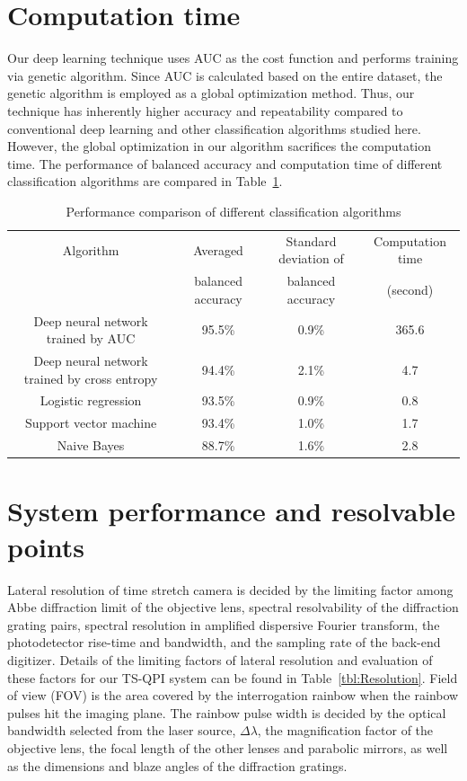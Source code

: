\documentclass[aps,pra,reprint,longbibliography,groupedaddress]{revtex4-1}
\begin{document}
\section*{Computation time}

Our deep learning technique uses AUC as the cost function and performs training via genetic algorithm. Since AUC is calculated based on the entire dataset, the genetic algorithm is employed as a global optimization method. Thus, our technique has inherently higher accuracy and repeatability compared to conventional deep learning and other classification algorithms studied here. However, the global optimization in our algorithm sacrifices the computation time. The performance of balanced accuracy and computation time of different classification algorithms are compared in Table~\ref{tbl:RunningTime}.

\begin{table}
\caption{\label{tbl:RunningTime} Performance comparison of different classification algorithms}
\begin{tabular}{ c | c | c | c }
 \hline
  Algorithm & Averaged & Standard deviation of & Computation time\\
   & balanced accuracy & balanced accuracy & (second)\\
  \hline
  Deep neural network trained by AUC & 95.5\% & 0.9\% & 365.6\\
  Deep neural network trained by cross entropy & 94.4\% & 2.1\% & 4.7\\
  Logistic regression & 93.5\% & 0.9\% & 0.8\\
  Support vector machine & 93.4\% & 1.0\% & 1.7\\
  Naive Bayes & 88.7\% & 1.6\% & 2.8\\
  \hline
\end{tabular}
\end{table}

\section*{System performance and resolvable points}

Lateral resolution of time stretch camera is decided by the limiting factor among Abbe diffraction limit of the objective lens, spectral resolvability of the diffraction grating pairs, spectral resolution in amplified dispersive Fourier transform, the photodetector rise-time and bandwidth, and the sampling rate of the back-end digitizer. Details of the limiting factors of lateral resolution and evaluation of these factors for our TS-QPI system can be found in Table~\ref{tbl:Resolution}. Field of view (FOV) is the area covered by the interrogation rainbow when the rainbow pulses hit the imaging plane. The rainbow pulse width is decided by the optical bandwidth selected from the laser source, $\Delta\lambda$, the magnification factor of the objective lens, the focal length of the other lenses and parabolic mirrors, as well as the dimensions and blaze angles of the diffraction gratings.
\end{document}
